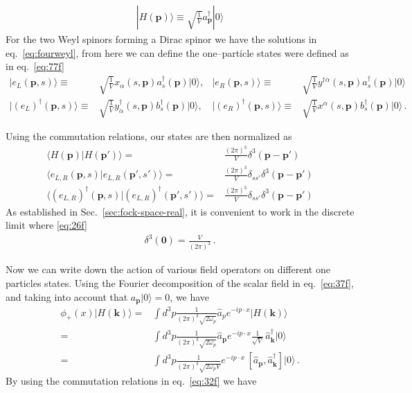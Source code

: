 \begin{frame}
\begin{align}
  | H(\mathbf{p})\rangle\equiv\sqrt{\frac{1}{V}}a^\dagger_{\mathbf{p}}|0\rangle 
\end{align}
For the two Weyl spinors forming a Dirac spinor we have the solutions in eq.~\eqref{eq:fourweyl}, from here we can define the one--particle states were defined as in eq.~\eqref{eq:77f}
\begin{align}
   | e_L(\mathbf{p},s)\rangle\equiv&\sqrt{\frac{1}{V}}x_{\alpha}\left(s,\mathbf{p}\right) a^\dagger_s(\mathbf{p})|0\rangle, &    | e_R(\mathbf{p},s)\rangle\equiv&\sqrt{\frac{1}{V}}y^{\dagger\dot{\alpha}}\left(s,\mathbf{p}\right)a^\dagger_s(\mathbf{p})|0\rangle\nonumber\\
   | \left( e_L \right)^{\dagger}(\mathbf{p},s)\rangle\equiv&\sqrt{\frac{1}{V}}y_{\dot{\alpha}}^{\dagger}\left(s,\mathbf{p}\right){b}^\dagger_s(\mathbf{p})|0\rangle,&
   | \left( e_R \right)^{\dagger}(\mathbf{p},s)\rangle\equiv&\sqrt{\frac{1}{V}}x^{\alpha}\left(s,\mathbf{p}\right){b}^\dagger_s(\mathbf{p})|0\rangle\,.
\end{align}

Using the commutation relations, our states are then normalized as
\begin{align}
\langle H(\mathbf{p})| H(\mathbf{p}')\rangle=&\frac{(2\pi)^3}{V}\delta^3(\mathbf{p}-\mathbf{p}')\nonumber\\
\langle e_{L,R}(\mathbf{p},s)| e_{L,R}(\mathbf{p}',s')\rangle=&\frac{(2\pi)^3}{V}\delta_{s s'}\delta^3(\mathbf{p}-\mathbf{p}')\nonumber\\
\langle \left( e_{L,R} \right)^{\dagger}(\mathbf{p},s)| \left( e_{L,R} \right)^{\dagger}(\mathbf{p}',s')\rangle=&\frac{(2\pi)^3}{V}\delta_{s s'}\delta^3(\mathbf{p}-\mathbf{p}')
\end{align}
As established in Sec.~\ref{sec:fock-space-real}, it is convenient to work in the discrete limit where \eqref{eq:26f}
\begin{align}
   \delta^3(\mathbf{0})=\frac{V}{(2\pi)^3}\,.
\end{align}

Now we can write down the action of various field operators on different one particles states. 
Using the Fourier decomposition  of the scalar field in eq.~\eqref{eq:37f}, and taking into account that 
$a_{\mathbf{p}}|0\rangle=0$, we have
\begin{align}
\label{eq:98f}
   \phi_+(x)|H(\mathbf{k})\rangle=&\int d^3p \frac{1}{(2\pi)^3\sqrt{2\omega_{p} }}
\widehat{a}_{p} e^{-i p\cdot x }
|H(\mathbf{k})\rangle\nonumber\\
=&\int d^3p \frac{1}{(2\pi)^3\sqrt{2\omega_{p}}}
\widehat{a}_\mathbf{p} e^{-i p\cdot x }
\frac{1}{\sqrt{V}}\, \widehat{a}^\dagger_{\mathbf{k}}|0\rangle\nonumber\\
  =&\int d^3p \frac{1}{(2\pi)^3\sqrt{2\omega_{p}V}} e^{-i p\cdot x }
\, [\widehat{a}_{\mathbf{p}},\widehat{a}^\dagger_{\mathbf{k}}]|0\rangle\,.
\end{align}
By using the commutation relations in eq.~\eqref{eq:32f} we have


\end{frame}

